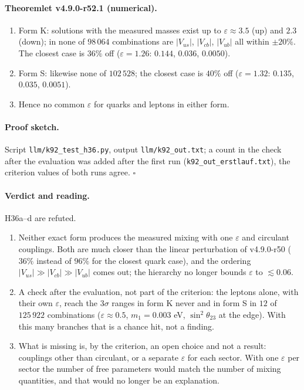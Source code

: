 \paragraph{Theoremlet v4.9.0-r52.1 (numerical).}
\begin{enumerate}[leftmargin=2em]
\item[(a)] Form K: solutions with the measured masses exist up to \(\varepsilon\approx3.5\) (up) and \(2.3\) (down); in none of \(98\,064\)
combinations are \(|V_{us}|\), \(|V_{cb}|\), \(|V_{ub}|\) all within \(\pm20\%\).  The closest case is \(36\%\) off
(\(\varepsilon=1.26\): \(0.144\), \(0.036\), \(0.0050\)).
\item[(b)] Form S: likewise none of \(102\,528\); the closest case is \(40\%\) off (\(\varepsilon=1.32\): \(0.135\), \(0.035\), \(0.0051\)).
\item[(c)] Hence no common \(\varepsilon\) for quarks and leptons in either form.
\end{enumerate}

\paragraph{Proof sketch.}
Script \texttt{llm/k92\_test\_h36.py}, output \texttt{llm/k92\_out.txt}; a count in the check after the evaluation was added after the first run
(\texttt{k92\_out\_erstlauf.txt}), the criterion values of both runs agree.  \(\square\)

\paragraph{Verdict and reading.}
H36a--d are refuted.
\begin{enumerate}[leftmargin=2em]
\item Neither exact form produces the measured mixing with one \(\varepsilon\) and circulant couplings.  Both are much closer than the linear
perturbation of v4.9.0-r50 (\(36\%\) instead of \(96\%\) for the closest quark case), and the ordering
\(|V_{us}|\gg|V_{cb}|\gg|V_{ub}|\) comes out; the hierarchy no longer bounds \(\varepsilon\) to \(\lesssim0.06\).
\item A check after the evaluation, not part of the criterion: the leptons alone, with their own \(\varepsilon\), reach the \(3\sigma\) ranges in
form K never and in form S in \(12\) of \(125\,922\) combinations (\(\varepsilon\approx0.5\), \(m_1=0.003\) eV, \(\sin^2\theta_{23}\) at the
edge).  With this many branches that is a chance hit, not a finding.
\item What is missing is, by the criterion, an open choice and not a result: couplings other than circulant, or a separate \(\varepsilon\) for each
sector.  With one \(\varepsilon\) per sector the number of free parameters would match the number of mixing quantities, and that would no longer
be an explanation.
\end{enumerate}

